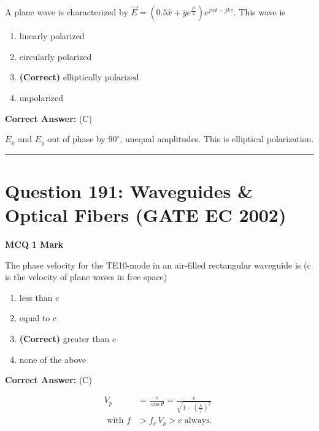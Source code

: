 \documentclass[11pt,a4paper]{article}
\begin{document}
\noindent A plane wave is characterized by 
$\vec{E}=(0.5\hat{x}+\hat{y}e^{\frac{j\pi }{2}})e^{jwt-jkz}$.
 This wave is


\begin{enumerate}[label=(\Alph*)]
    \item linearly polarized
    \item circularly polarized
    \item \textbf{(Correct)} elliptically polarized
    \item unpolarized
\end{enumerate}

\noindent \textbf{Correct Answer:} (C)

\begin{tcolorbox}[solbox, title=Detailed Solution -- Question 190]
$E_{x}$ and $E_{y}$ out of phase by $90^{\circ}$, unequal amplitudes.
 This is elliptical polarization.
\end{tcolorbox}

\vspace{1.5em}
\hrule
\vspace{1.5em}

\section*{Question 191: Waveguides \& Optical Fibers (GATE EC 2002)}
\noindent \textbf{\color{primary}MCQ} \hfill \textbf{\color{secondary}1 Mark}


\noindent The phase velocity for the TE10-mode in an air-filled rectangular waveguide is (c
is the velocity of plane waves in free space)


\begin{enumerate}[label=(\Alph*)]
    \item less than c
    \item equal to c
    \item \textbf{(Correct)} greater than c
    \item none of the above
\end{enumerate}

\noindent \textbf{Correct Answer:} (C)

\begin{tcolorbox}[solbox, title=Detailed Solution -- Question 191]
\[
\begin{aligned} V_{p}&=\frac{c}{\cos \theta}=\frac{c}{\sqrt{1-\left(\frac{f_{c}}{f}\right)^{2}}} \\ \text { with } f&>f_{c^{\prime}} V_{p}>c \text { always. } \end{aligned}
\]
\end{tcolorbox}
\end{document}
